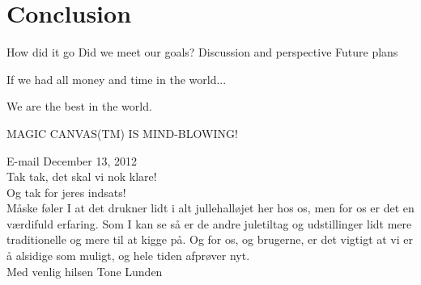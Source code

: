 \chapter{Conclusion}
How did it go
Did we meet our goals?
Discussion and perspective
Future plans

If we had all money and time in the world...

We are the best in the world.

MAGIC CANVAS(TM) IS MIND-BLOWING!

\begin{fancyquotes}
E-mail December 13, 2012\\
Tak tak, det skal vi nok klare!\\

Og tak for jeres indsats!\\
M{\aa}ske f{\o}ler I at det drukner lidt i alt jullehall{\o}jet her hos os, men for os er det en v{\ae}rdifuld erfaring. Som I kan se s{\aa} er de andre juletiltag og udstillinger lidt mere traditionelle og mere til at kigge p{\aa}. Og for os, og brugerne, er det vigtigt at vi er {\aa} alsidige som muligt, og hele tiden afpr{\o}ver nyt.\\

Med venlig hilsen
Tone Lunden
\end{fancyquotes}
